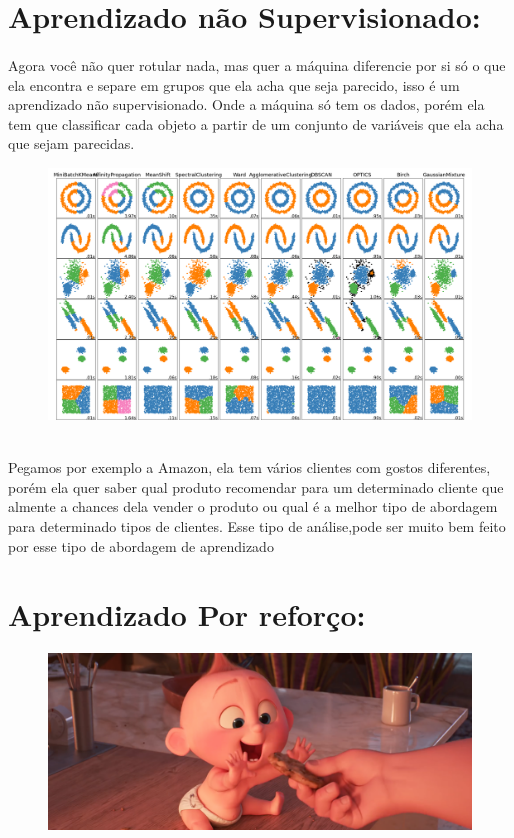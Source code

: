\documentclass[12pt]{article}
\begin{document}
    \section{Aprendizado não Supervisionado:}
    \paragraph{} Agora você não quer rotular nada, mas quer a máquina diferencie por si só o que ela encontra
    e separe em grupos que ela acha que seja parecido, isso é um aprendizado não supervisionado.
    Onde a máquina só tem os dados, porém ela tem que classificar cada objeto a partir de um
    conjunto de variáveis  que ela acha que sejam parecidas. 
    \\
      \begin{figure}[ht]
        \centering
        \includegraphics[scale = 0.3]{classificação de grupos.png}
    \end{figure}
    \\
    Pegamos por exemplo a Amazon,
    ela tem vários clientes com gostos diferentes, porém ela quer saber qual produto recomendar para um determinado
    cliente que almente a chances dela vender o produto ou qual é a melhor tipo de abordagem para determinado 
    tipos de clientes. Esse tipo de análise,pode ser muito bem feito por esse tipo de abordagem de aprendizado   

    \section{Aprendizado Por reforço:}
    \begin{figure}[ht]
        \centering
        \includegraphics[scale = 0.2]{jack-jack-num-num-cookie_orig.png}
    \end{figure}
\end{document}
